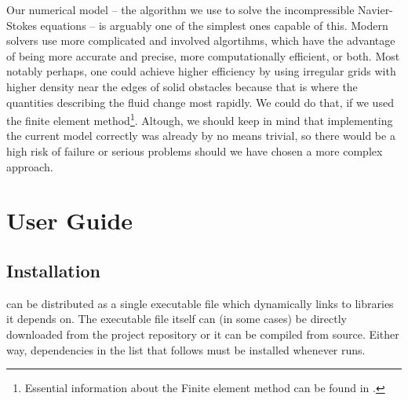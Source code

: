\documentclass[11pt,a4paper,twoside,openright]{report}
\begin{document}
Our numerical model -- the algorithm we use to solve the incompressible Navier-Stokes equations -- is arguably one of the simplest ones capable of this. Modern solvers use more complicated and involved algortihms, which have the advantage of being more accurate and precise, more computationally efficient, or both. Most notably perhaps, one could achieve higher efficiency by using irregular grids with higher density near the edges of solid obstacles because that is where the quantities describing the fluid change most rapidly. We could do that, if we used the finite element method\footnote{Essential information about the Finite element method can be found in \cite{WikiFEM}.}. Altough, we should keep in mind that implementing the current model correctly was already by no means trivial, so there would be a high risk of failure or serious problems should we have chosen a more complex approach.


\chapter{User Guide}

\section{Installation}

\pname{} can be distributed as a single executable file which dynamically links to libraries it depends on. The executable file itself can (in some cases) be directly downloaded from the project repository or it can be compiled from source. Either way, dependencies in the list that follows must be installed whenever \pname{} runs.
\end{document}
